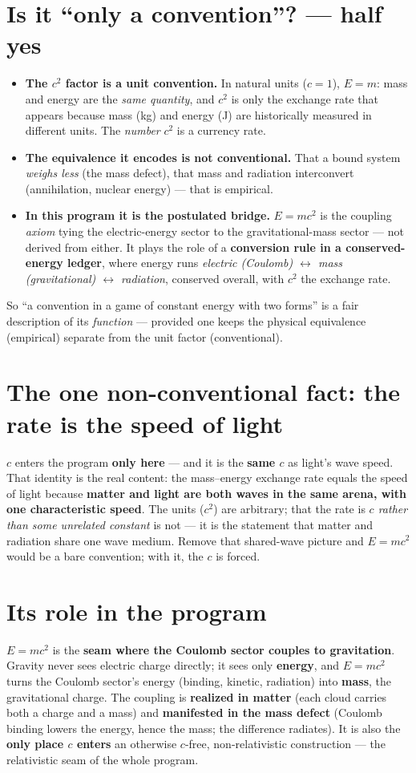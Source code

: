 \documentclass[11pt]{article}
\begin{document}
\section{Is it ``only a convention''? --- half yes}
\begin{itemize}
\item \textbf{The $c^2$ factor is a unit convention.} In natural units ($c=1$), $E=m$: mass and energy are the
\emph{same quantity}, and $c^2$ is only the exchange rate that appears because mass (kg) and energy (J) are
historically measured in different units. The \emph{number} $c^2$ is a currency rate.
\item \textbf{The equivalence it encodes is not conventional.} That a bound system \emph{weighs less} (the mass
defect), that mass and radiation interconvert (annihilation, nuclear energy) --- that is empirical.
\item \textbf{In this program it is the postulated bridge.} $E=mc^2$ is the coupling \emph{axiom} tying the
electric-energy sector to the gravitational-mass sector --- not derived from either. It plays the role of a
\textbf{conversion rule in a conserved-energy ledger}, where energy runs \emph{electric (Coulomb)
$\leftrightarrow$ mass (gravitational) $\leftrightarrow$ radiation}, conserved overall, with $c^2$ the exchange
rate.
\end{itemize}
So ``a convention in a game of constant energy with two forms'' is a fair description of its \emph{function} ---
provided one keeps the physical equivalence (empirical) separate from the unit factor (conventional).

\section{The one non-conventional fact: the rate is the speed of light}
$c$ enters the program \textbf{only here} --- and it is the \textbf{same $c$} as light's wave speed. That
identity is the real content: the mass--energy exchange rate equals the speed of light because \textbf{matter
and light are both waves in the same arena, with one characteristic speed}. The units ($c^2$) are arbitrary;
that the rate is \emph{$c$ rather than some unrelated constant} is not --- it is the statement that matter and
radiation share one wave medium. Remove that shared-wave picture and $E=mc^2$ would be a bare convention; with
it, the $c$ is forced.

\section{Its role in the program}
$E=mc^2$ is the \textbf{seam where the Coulomb sector couples to gravitation}. Gravity never sees electric
charge directly; it sees only \textbf{energy}, and $E=mc^2$ turns the Coulomb sector's energy (binding,
kinetic, radiation) into \textbf{mass}, the gravitational charge. The coupling is \textbf{realized in matter}
(each cloud carries both a charge and a mass) and \textbf{manifested in the mass defect} (Coulomb binding
lowers the energy, hence the mass; the difference radiates). It is also the \textbf{only place $c$ enters} an
otherwise $c$-free, non-relativistic construction --- the relativistic seam of the whole program.
\end{document}
